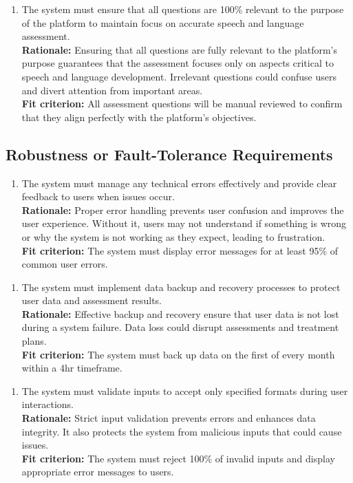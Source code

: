 \documentclass[12pt]{article}
\begin{document}
\begin{enumerate}[{PR-PA}5. ]
  \item The system must ensure that all questions are 100\% relevant to the purpose of the platform to maintain focus on accurate speech and language assessment.\\
  \textbf{Rationale: }Ensuring that all questions are fully relevant to the platform’s purpose guarantees that the assessment focuses only on aspects critical to speech and language development. Irrelevant questions could confuse users and divert attention from important areas.\\
  \textbf{Fit criterion: }All assessment questions will be manual reviewed to confirm that they align perfectly with the platform's objectives.  
\end{enumerate}

\subsection{Robustness or Fault-Tolerance Requirements}
\begin{enumerate}[{PR-RFT}1. ]
  \item The system must manage any technical errors effectively and provide clear feedback to users when issues occur.\\
  \textbf{Rationale: }Proper error handling prevents user confusion and improves the user experience. Without it, users may not understand if something is wrong or why the system is not working as they expect, leading to frustration.\\
  \textbf{Fit criterion: }The system must display error messages for at least 95\% of common user errors.  
\end{enumerate}
\begin{enumerate}[{PR-RFT}2. ]
  \item The system must implement data backup and recovery processes to protect user data and assessment results.\\
  \textbf{Rationale: }Effective backup and recovery ensure that user data is not lost during a system failure. Data loss could disrupt assessments and treatment plans.\\
  \textbf{Fit criterion: }The system must back up data on the first of every month within a 4hr timeframe.  
\end{enumerate}
\begin{enumerate}[{PR-RFT}3. ]
  \item The system must validate inputs to accept only specified formats during user interactions.\\
  \textbf{Rationale: }Strict input validation prevents errors and enhances data integrity. It also protects the system from malicious inputs that could cause issues.\\
  \textbf{Fit criterion: }The system must reject 100\% of invalid inputs and display appropriate error messages to users.  
\end{enumerate}
\end{document}
